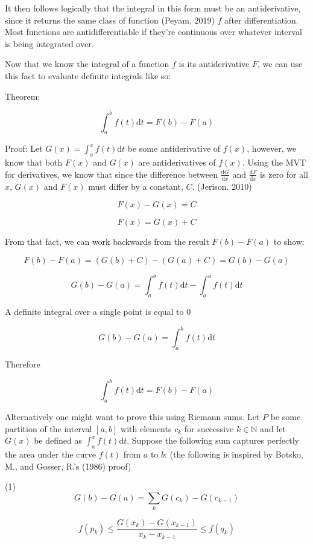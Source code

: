 \documentclass[11pt]{article}
\begin{document}
It then follows logically that the integral in this form must be an antiderivative, since it returns the same class of function (Peyam, 2019) $f$ after differentiation. Most functions are antidifferentiable if they're continuous over whatever interval is being integrated over.

Now that we know the integral of a function $f$ is its antiderivative $F$, we can use this fact to evaluate definite integrals like so:

Theorem:

\Large{}$$\int_{a}^{b}f(t)\mathrm{d}t = F(b) - F(a)$$\normalsize{}

Proof: Let $\displaystyle{G(x) = \int_{a}^{x}f(t)\mathrm{d}t}$ be some antiderivative of $f(x)$, however, we know that both $F(x)$ and $G(x)$ are antiderivatives of $f(x)$. Using the MVT for derivatives, we know that since the difference between $\displaystyle{\frac{\mathrm{d}G}{\mathrm{d}x}}$ and $\displaystyle{\frac{\mathrm{d}F}{\mathrm{d}x}}$ is zero for all $x$, $G(x)$ and $F(x)$ must differ by a constant, $C$. (Jerison. 2010)

\Large{}$$F(x)-G(x)=C$$

$$F(x)=G(x)+C$$\normalsize{}

From that fact, we can work backwards from the result $F(b)-F(a)$ to show:

\Large{}$$F(b)-F(a) = (G(b)+C) - (G(a)+C) = G(b)-G(a)$$

$$G(b) - G(a) = \int_{a}^{b}f(t)\mathrm{d}t - \int_{a}^{a}f(t)\mathrm{d}t$$\normalsize{}

A definite integral over a single point is equal to $0$

\Large{}$$G(b) - G(a) = \int_{a}^{b}f(t)\mathrm{d}t$$\normalsize{}

Therefore

\Large{}$$\int_{a}^{b}f(t)\mathrm{d}t = F(b) - F(a)$$\normalsize{}

Alternatively one might want to prove this using Riemann sums. Let $P$ be some partition of the interval $[a,b]$ with elements ${c_k}$ for successive $k\in\mathbb{N}$ and let $G(x)$ be defined as $\displaystyle{\int_{a}^{x}f(t)\mathrm{d}t}$. Suppose the following sum captures perfectly the area under the curve $f(t)$ from $a$ to $b$: (the following is inspired by Botsko, M., and  Gosser, R.'s (1986) proof) 
\pagebreak

\Large{}(1)$$G(b)-G(a) = \sum_k{G(c_k)-G(c_{k-1})}$$ 

$$f(p_k)\leq \frac{G(x_k)-G(x_{k-1})}{x_k-x_{k-1}}\leq f(q_k)$$
\end{document}

